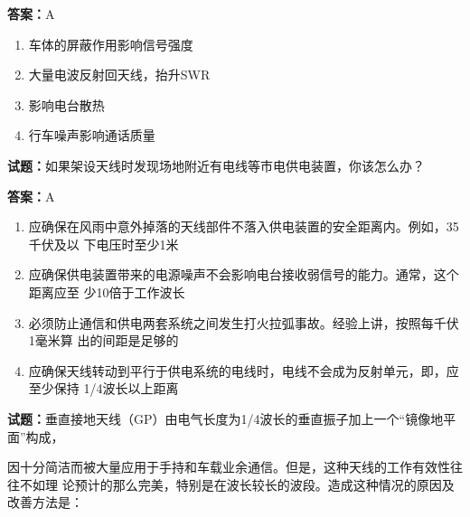 \documentclass{ctexbook}
\begin{document}
\textbf{答案：}A 

\begin{enumerate}[leftmargin=3em]
  \item 车体的屏蔽作用影响信号强度 

  \item 大量电波反射回天线，抬升SWR 

  \item 影响电台散热 

  \item 行车噪声影响通话质量 

\end{enumerate}





\vspace{1em}

\textbf{试题：}如果架设天线时发现场地附近有电线等市电供电装置，你该怎么办？ 

\textbf{答案：}A 

\begin{enumerate}[leftmargin=3em]
  \item 应确保在风雨中意外掉落的天线部件不落入供电装置的安全距离内。例如，35千伏及以
下电压时至少1米 

  \item 应确保供电装置带来的电源噪声不会影响电台接收弱信号的能力。通常，这个距离应至
少10倍于工作波长 

  \item 必须防止通信和供电两套系统之间发生打火拉弧事故。经验上讲，按照每千伏1毫米算
出的间距是足够的 

  \item 应确保天线转动到平行于供电系统的电线时，电线不会成为反射单元，即，应至少保持
1/4波长以上距离 

\end{enumerate}





\vspace{1em}

\textbf{试题：}垂直接地天线（GP）由电气长度为1/4波长的垂直振子加上一个“镜像地平面”构成，


因十分简洁而被大量应用于手持和车载业余通信。但是，这种天线的工作有效性往往不如理
论预计的那么完美，特别是在波长较长的波段。造成这种情况的原因及改善方法是： 
\end{document}
